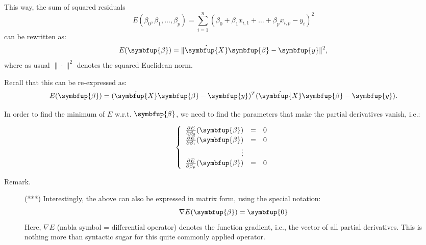 \documentclass[10pt,b5paper,krantz1]{krantz}
\renewcommand{\mathbf}[1]{\symbfup{#1}}
\renewcommand{\boldsymbol}[1]{\symbfup{#1}}
\begin{document}
This way, the sum of squared residuals
\[
E(\beta_0, \beta_1, \dots, \beta_p)=
\sum_{i=1}^n \left( \beta_0 + \beta_1 x_{i,1}+\dots+\beta_p x_{i,p} - y_{i} \right)^2
\]
can be rewritten as:
\[
E(\boldsymbol\beta)=\| \dot{\mathbf{X}} \boldsymbol\beta - \mathbf{y} \|^2,
\]
where as usual \(\|\cdot\|^2\) denotes the squared Euclidean norm.

Recall that this can be re-expressed as:
\[
E(\boldsymbol\beta)= (\dot{\mathbf{X}} \boldsymbol\beta - \mathbf{y})^T (\dot{\mathbf{X}} \boldsymbol\beta - \mathbf{y}).
\]

In order to find the minimum of \(E\) w.r.t. \(\boldsymbol\beta\),
we need to find the parameters that make the partial derivatives vanish, i.e.:

\[
\left\{
\begin{array}{rcl}
\frac{\partial E}{\partial \beta_0}(\boldsymbol\beta)&=&0 \\
\frac{\partial E}{\partial \beta_1}(\boldsymbol\beta)&=&0 \\
\vdots\\
\frac{\partial E}{\partial \beta_p}(\boldsymbol\beta)&=&0 \\
\end{array}
\right.
\]

\begin{description}
\item[Remark.]
(***) Interestingly, the above can also be expressed in matrix form,
using the special notation:
\[
\nabla E(\boldsymbol\beta) = \boldsymbol{0}
\]
Here, \(\nabla E\) (nabla symbol = differential operator)
denotes the function gradient, i.e., the vector of all partial derivatives.
This is nothing more than syntactic sugar for this quite commonly applied operator.
\end{description}
\end{document}
